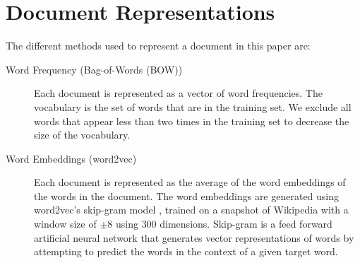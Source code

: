 \documentclass[11pt]{article}
\begin{document}
\section{Document Representations}\label{sec:representation}
The different methods used to represent a document in this paper are:
\begin{description}

\item[Word Frequency (Bag-of-Words (BOW))] Each document is
  represented as a vector of word frequencies. The vocabulary is the
  set of words that are in the training set. We exclude all words that
  appear less than two times in the training set to decrease the size
  of the vocabulary.


\item[Word Embeddings (word2vec)] Each document is represented as the
  average of the word embeddings of the words in the document. The
  word embeddings are generated using word2vec's skip-gram model
  \cite{Mikolov+:2013b}, trained on a snapshot of Wikipedia with a
  window size of $\pm8$ using $300$ dimensions. Skip-gram is a feed
  forward artificial neural network that generates vector
  representations of words by attempting to predict the words in the
  context of a given target word.

\end{description}
\end{document}

